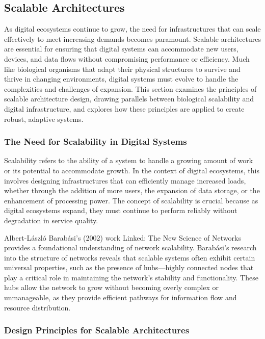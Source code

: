 \documentclass[12pt,twoside]{article}
\begin{document}
\subsection{Scalable Architectures}

As digital ecosystems continue to grow, the need for infrastructures that can scale effectively to meet increasing demands becomes paramount. Scalable architectures are essential for ensuring that digital systems can accommodate new users, devices, and data flows without compromising performance or efficiency. Much like biological organisms that adapt their physical structures to survive and thrive in changing environments, digital systems must evolve to handle the complexities and challenges of expansion. This section examines the principles of scalable architecture design, drawing parallels between biological scalability and digital infrastructure, and explores how these principles are applied to create robust, adaptive systems.

\subsubsection{The Need for Scalability in Digital Systems}

Scalability refers to the ability of a system to handle a growing amount of work or its potential to accommodate growth. In the context of digital ecosystems, this involves designing infrastructures that can efficiently manage increased loads, whether through the addition of more users, the expansion of data storage, or the enhancement of processing power. The concept of scalability is crucial because as digital ecosystems expand, they must continue to perform reliably without degradation in service quality.

Albert-László Barabási’s (2002) work Linked: The New Science of Networks provides a foundational understanding of network scalability. Barabási’s research into the structure of networks reveals that scalable systems often exhibit certain universal properties, such as the presence of hubs—highly connected nodes that play a critical role in maintaining the network’s stability and functionality. These hubs allow the network to grow without becoming overly complex or unmanageable, as they provide efficient pathways for information flow and resource distribution.

\subsubsection{Design Principles for Scalable Architectures}
\end{document}
